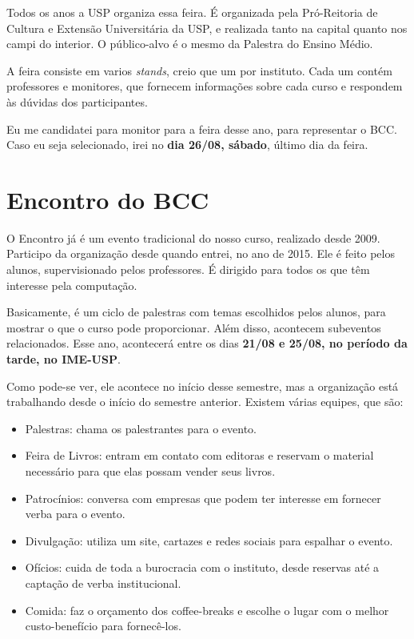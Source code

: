 \documentclass[12pt,letterpaper]{article}
\begin{document}
	Todos os anos a USP organiza essa feira. É organizada pela Pró-Reitoria de Cultura e Extensão Universitária da USP, e realizada tanto na capital quanto nos campi do interior. O público-alvo é o mesmo da Palestra do Ensino Médio.
	
	A feira consiste em varios \textit{stands}, creio que um por instituto. Cada um contém professores e monitores, que fornecem informações sobre cada curso e respondem às dúvidas dos participantes.
	
	Eu me candidatei para monitor para a feira desse ano, para representar o BCC. Caso eu seja selecionado, irei no \textbf{dia 26/08, sábado}, último dia da feira.
	
	\section{Encontro do BCC}
	
	O Encontro já é um evento tradicional do nosso curso, realizado desde 2009. Participo da organização desde quando entrei, no ano de 2015.	Ele é feito pelos alunos, supervisionado pelos professores. É dirigido para todos os que têm interesse pela computação.
	
	Basicamente, é um ciclo de palestras com temas escolhidos pelos alunos, para mostrar o que o curso pode proporcionar. Além disso, acontecem subeventos relacionados. Esse ano, acontecerá entre os dias \textbf{21/08 e 25/08, no período da tarde, no IME-USP}. 
	
	Como pode-se ver, ele acontece no início desse semestre, mas a organização está trabalhando desde o início do semestre anterior. Existem várias equipes, que são:
	
	\begin{itemize}
		\item Palestras: chama os palestrantes para o evento.
		\item Feira de Livros: entram em contato com editoras e reservam o material necessário para que elas possam vender seus livros.
		\item Patrocínios: conversa com empresas que podem ter interesse em fornecer verba para o evento.
		\item Divulgação: utiliza um site, cartazes e redes sociais para espalhar o evento.
		\item Ofícios: cuida de toda a burocracia com o instituto, desde reservas até a captação de verba institucional.
		\item Comida: faz o orçamento dos coffee-breaks e escolhe o lugar com o melhor custo-benefício para fornecê-los.
	\end{itemize}
	
\end{document}

